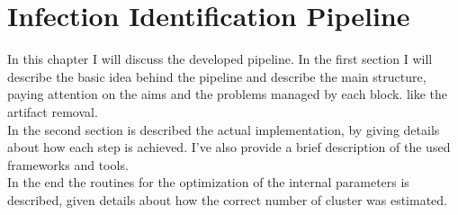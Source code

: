 \documentclass{standalone}
\begin{document}
	\chapter{Infection Identification Pipeline}
	
	
	In this chapter I will discuss the developed pipeline. In the first section I will describe the basic idea behind the pipeline and describe the main structure, paying attention on the aims and the problems managed by each block. like the artifact removal. \\
	In the second section is described the actual implementation, by giving details about how each step is achieved. I've also provide a brief description of the used frameworks and tools.\\
	In the end the routines for the optimization of the internal parameters is described, given details about how the correct number of cluster was estimated.

	
	
\end{document}
